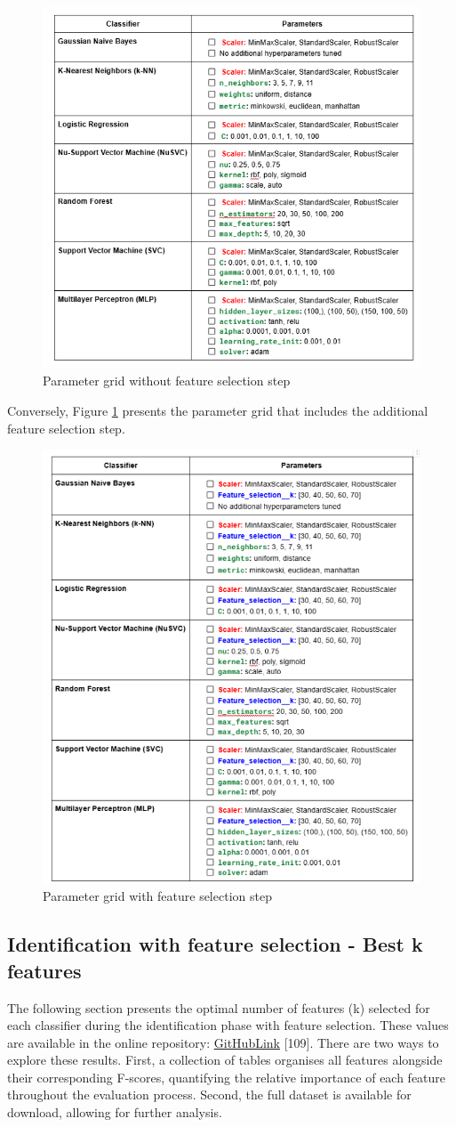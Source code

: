 \documentclass{article}
\begin{document}
\begin{figure}[ht]
    \centering
    \includegraphics[width = 0.4
    \textwidth]{Images/Results/param_grid_nofs.png}
    \caption{Parameter grid without feature selection step}
    \label{fig:pg_nofs}
\end{figure}

Conversely, Figure \ref{fig:pg_nofs} presents the parameter grid that includes the additional feature selection step.

\begin{figure}[ht]
    \centering
    \includegraphics[width = 0.4
    \textwidth]{Images/Results/fs.png}
    \caption{Parameter grid with feature selection step}
    \label{fig:pg_fs}
\end{figure}

\newpage
\subsection{Identification with feature selection - Best k features}
\label{subsec:id_fs_k}

The following section presents the optimal number of features (k) selected for each classifier during the identification phase with feature selection.
These values are available in the online repository:
\href{https://github.com/DavideMascheroni99/movingText/tree/main/Programs/Machine_Learning/Machine_Learning_results/Identification_results/Identification_KBest/Feature}{GitHubLink} [109].
There are two ways to explore these results. 
First, a collection of tables organises all features alongside their corresponding F-scores, quantifying the relative importance of each feature throughout the evaluation process.
Second, the full dataset is available for download, allowing for further analysis.
\end{document}

